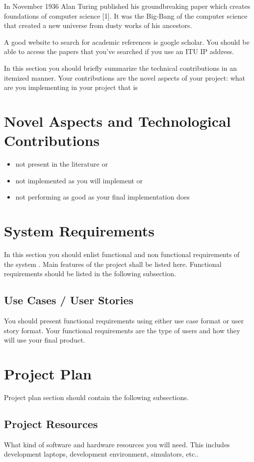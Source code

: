 \documentclass[a4paper, 12pt, titlepage]{article}
\begin{document}
In November 1936 Alan Turing published his groundbreaking paper which creates foundations of computer science [1]. It was the Big-Bang of the computer science that created a new universe from dusty works of his ancestors.

A good website to search for academic references is google scholar. You should be able to access the papers that you've searched if you use an ITU IP address.

In this section you should briefly summarize the technical contributions in an itemized manner. Your contributions are the novel aspects of your project: what are you implementing in your project that is

\newpage
\section{Novel Aspects and Technological Contributions}

\begin{itemize}
    \item 	not present in the literature or
    \item not implemented as you will implement or
    \item not performing as good as your final implementation does

\end{itemize}

\newpage
\section{System Requirements}
In this section you should enlist functional and non functional requirements of the system . Main features of the project shall be listed here. Functional requirements should be listed in the following subsection.

\subsection{Use Cases / User Stories}
You should present functional requirements using either use case format or user story format. Your functional requirements are the type of users and how they will use your final product.

\newpage
\section{Project Plan}
Project plan section should contain the following subsections.
\subsection{Project Resources}
What kind of software and hardware resources you will need. This includes development laptops, development environment, simulators, etc..
\end{document}
